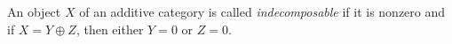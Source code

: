\begin{definition}
\label{definition-indecomposable}
An object $X$ of an additive category is called {\it indecomposable}
if it is nonzero and if $X = Y \oplus Z$, then either $Y = 0$ or $Z = 0$.
\end{definition}